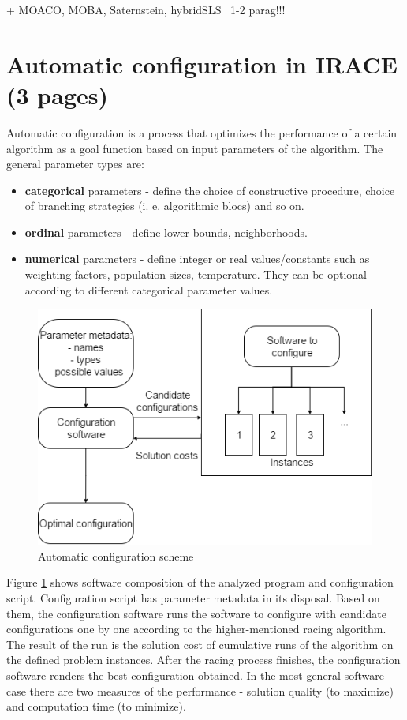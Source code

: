 \documentclass[12pt]{article}
\begin{document}
+ MOACO, MOBA, Saternstein, hybridSLS ~1-2 parag!!!



\section{Automatic configuration in IRACE (3 pages)}

Automatic configuration is a process that optimizes the performance of a certain algorithm as a goal function based on input parameters of the algorithm. The general parameter types are:
 
\begin{itemize}
\item \textbf{categorical} parameters - define the choice of constructive procedure, choice of branching strategies (i. e. algorithmic blocs) and so on.
\item \textbf{ordinal} parameters - define lower bounds, neighborhoods.
\item \textbf{numerical} parameters - define integer or real values/constants such as weighting factors, population sizes, temperature. They can be optional according to different categorical parameter values.
\end{itemize}

\begin{figure}[H]
  \centering
    \includegraphics[scale=0.7]{configuration-top-level.png}
  \caption{Automatic configuration scheme}
  \label{fig:autoconf}
\end{figure}

Figure \ref{fig:autoconf} shows software composition of the analyzed program and configuration script. Configuration script has parameter metadata in its disposal. Based on them, the configuration software runs the software to configure with candidate configurations one by one according to the higher-mentioned racing algorithm. The result of the run is the solution cost of cumulative runs of the algorithm on the defined problem instances. After the racing process finishes, the configuration software renders the best configuration obtained. In the most general software case there are two measures of the performance - solution quality (to maximize) and computation time (to minimize).
\end{document}
